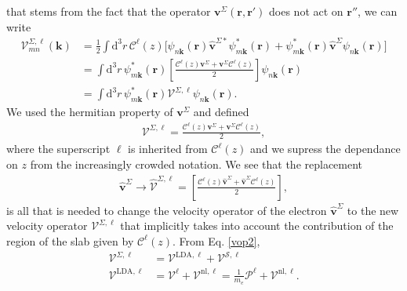 that stems from the fact that the operator $\mathbf{v}^\Sigma(\mathbf{r},\mathbf{r}')$ does not act on
$\mathbf{r}''$, we can write
\begin{align}\label{nl.3}
\boldsymbol{\mathcal{V}}^{\Sigma,\ell}_{mn}({\mathbf k})
&=
\frac{1}{2}
\int \mathrm{d}^3 r\,
 \mathcal{C}^{\ell}(z)
 \bigg[
\psi_{n\mathbf{k}}(\mathbf{r})
\hat{\mathbf{v}}^{\Sigma *}\psi^{*}_{m\mathbf{k}}(\mathbf{r})
+ 
\psi^*_{m\mathbf{k}}(\mathbf{r})\hat{\mathbf{v}}^{\Sigma}
\psi_{n\mathbf{k}}(\mathbf{r})
\bigg]
\nonumber\\
&=
\int \mathrm{d}^3 r\,
\psi^*_{m\mathbf{k}}(\mathbf{r})
\left[\frac{\mathcal{C}^{\ell}(z) \mathbf{v}^\Sigma +
\mathbf{v}^\Sigma \mathcal{C}^{\ell}(z)}{2}\right]
\psi_{n\mathbf{k}}(\mathbf{r})
\nonumber\\
&=
\int \mathrm{d}^3 r\,
\psi^*_{m\mathbf{k}}(\mathbf{r})
\boldsymbol{\mathcal{V}}^{\Sigma,\ell}
\psi_{n\mathbf{k}}(\mathbf{r})
.
\end{align}
We used the hermitian property of $\mathbf{v}^\Sigma$ and defined
\begin{align}\label{nl.4}
\boldsymbol{\mathcal{V}}^{\Sigma,\ell}
=
\frac{\mathcal{C}^{\ell}(z) \mathbf{v}^\Sigma +
\mathbf{v}^\Sigma \mathcal{C}^{\ell}(z)}{2}
,
\end{align} 
where the superscript $\ell$ is inherited from $\mathcal{C}^{\ell}(z)$ and we
supress the dependance on $z$ from the increasingly crowded notation.  
We see that the replacement
\begin{align}\label{vcali}
\hat{\mathbf{v}}^{\Sigma} \to \hat{\boldsymbol{\mathcal{V}}}^{\Sigma,\ell}=\left[\frac{\mathcal{C}^{\ell}(z) \hat{\mathbf{v}}^{\Sigma} +
\hat{\mathbf{v}}^{\Sigma}\mathcal{C}^{\ell}(z)}{2}\right]
,
\end{align} 
is all that is needed to change the
velocity operator of the electron $\hat{\mathbf{v}}^{\Sigma}$ to the new velocity
operator $\boldsymbol{\mathcal{V}}^{\Sigma,\ell}$ that implicitly takes into account the
contribution of the region of the slab given by $\mathcal{C}^{\ell}(z)$.
From Eq. \eqref{vop2},
\begin{align}\label{vopii}
\boldsymbol{\mathcal{V}}^{\Sigma,\ell}
&=
\boldsymbol{\mathcal{V}}^{\mathrm{LDA},\ell}
+
\boldsymbol{\mathcal{V}}^{\mathcal{S},\ell}
\nonumber\\
\boldsymbol{\mathcal{V}}^{\mathrm{LDA},\ell}
&=
\boldsymbol{\mathcal{V}}^{\ell}
+
\boldsymbol{\mathcal{V}}^{\mathrm{nl},\ell}
=
\frac{1}{m_{e}}
\boldsymbol{\mathcal{P}}^{\ell}
+
\boldsymbol{\mathcal{V}}^{\mathrm{nl},\ell}
.
\end{align}
